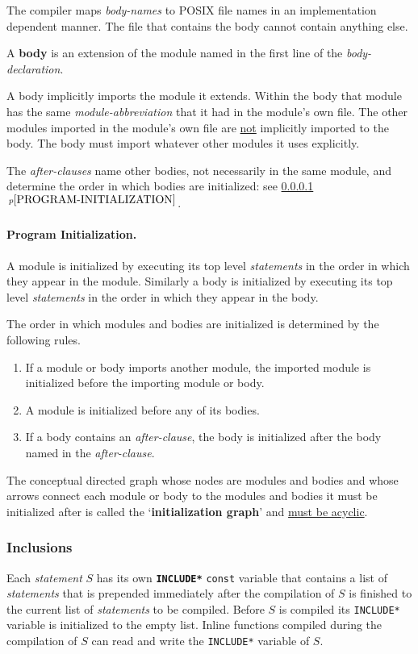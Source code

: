 \documentclass[12pt]{article}
\newcommand{\subsubsubsection}[1]{\paragraph[#1]{#1.}}
\newcommand{\key}[1]{{\rm \bfseries #1}}
\newcommand{\ttkey}[1]{{\tt \bfseries #1}}
\newcommand{\itemref}[1]{\ref{#1}$\,^{p\pageref{#1}}$}
\begin{document}
The compiler maps {\em body-names} to POSIX file names in an
implementation dependent manner.  The file that contains the
body cannot contain anything else.

A \key{body} is an extension of the module named in the first
line of the {\em body-declaration}.

A body implicitly imports the module it extends.  Within the
body that module has the same {\em module-abbreviation} that it
had in the module's own file.  The other modules imported in the
module's own file are \underline{not} implicitly imported
to the body.  The body must import whatever other modules it uses
explicitly.

The {\em after-clauses} name other bodies, not necessarily in
the same module,
and determine the order in which bodies are initialized:
see \itemref{PROGRAM-INITIALIZATION}.

\subsubsubsection{Program Initialization}
\label{PROGRAM-INITIALIZATION}

A module is initialized by executing its top level {\em statements}
in the order in which they appear in the module.  Similarly
a body is initialized by executing its top level {\em statements}
in the order in which they appear in the body.

The order in which modules and bodies are initialized is determined
by the following rules.
\begin{enumerate}
\item If a module or body imports another module, the imported module
is initialized before the importing module or body.
\item A module is initialized before any of its bodies.
\item If a body contains an {\em after-clause}, the body
is initialized after the body named in the {\em after-clause}.
\end{enumerate}

The conceptual directed graph whose nodes are modules and bodies
and whose arrows connect each module or body to the modules and
bodies it must be initialized after is called
the `\key{initialization graph}'\label{INITIALIZATION-GRAPH}
and \underline{must be acyclic}.

\subsubsection{Inclusions}
\label{INCLUSIONS}

Each {\em statement} $S$ has its own \ttkey{*INCLUDE*} {\tt const} variable
that contains a list of {\em statements} that is prepended
immediately after the compilation of $S$ is finished
to the current list of {\em statements} to be compiled. 
Before $S$ is compiled its {\tt *INCLUDE*} variable is initialized
to the empty list.  Inline functions compiled during the compilation of $S$
can read and write the {\tt *INCLUDE*} variable of $S$.
\end{document}

